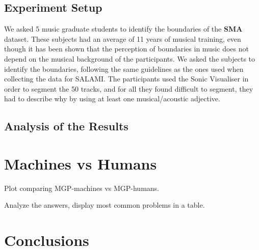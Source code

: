 \documentclass{article}
\begin{document}
\subsection{Experiment Setup}

We asked 5 music graduate students to identify the boundaries of the \textbf{SMA} dataset.
These subjects had an average of 11 years of musical training, even though it has been shown that the perception of boundaries in music does not depend on the musical background of the participants\cite{Bruderer2009}.
We asked the subjects to identify the boundaries, following the same guidelines as the ones used when collecting the data for SALAMI\cite{Smith2011}.
The participants used the Sonic Visualiser\cite{Cannam2006} in order to segment the 50 tracks, and for all they found difficult to segment, they had to describe why by using at least one musical/acoustic adjective.

\subsection{Analysis of the Results}



\section{Machines vs Humans}\label{section:m-vs-h}

Plot comparing MGP-machines vs MGP-humans.

Analyze the answers, display most common problems in a table.



\section{Conclusions}
\end{document}
